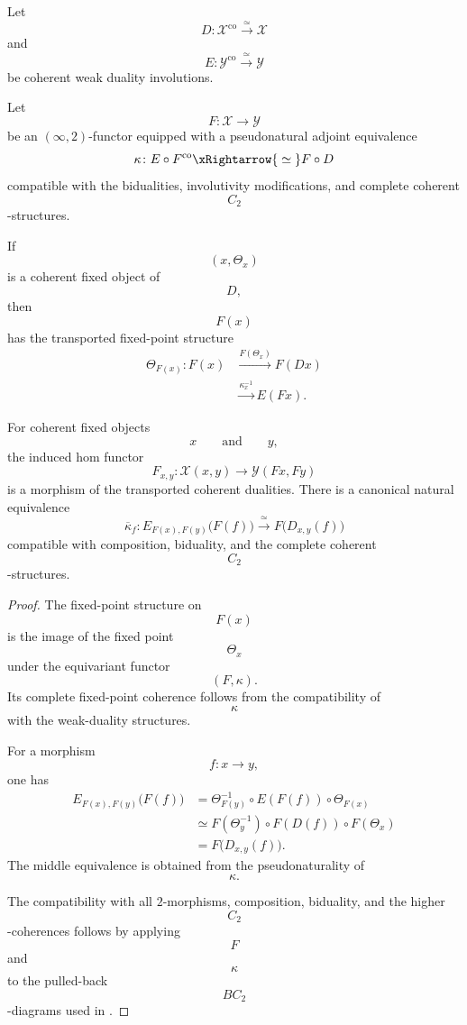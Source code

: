 \begin{proposition}
\label{prop:fixed-endpoint-transport-functoriality}
Let
\[
    D
    \colon
    \mathcal X^{\mathrm{co}}
    \xrightarrow{\;\simeq\;}
    \mathcal X
\]
and
\[
    E
    \colon
    \mathcal Y^{\mathrm{co}}
    \xrightarrow{\;\simeq\;}
    \mathcal Y
\]
be coherent weak duality involutions.

Let
\[
    F
    \colon
    \mathcal X
    \longrightarrow
    \mathcal Y
\]
be an $(\infty,2)$-functor equipped with a pseudonatural adjoint
equivalence
\[
    \kappa
    \colon
    E\circ F^{\mathrm{co}}
    \xRightarrow{\;\simeq\;}
    F\circ D
\]
compatible with the bidualities, involutivity modifications, and complete
coherent
\[
    C_2
\]
-structures.

If
\[
    (x,\Theta_x)
\]
is a coherent fixed object of
\[
    D,
\]
then
\[
    F(x)
\]
has the transported fixed-point structure
\[
\begin{aligned}
    \Theta_{F(x)}
    \colon
    F(x)
    &\xrightarrow{F(\Theta_x)}
    F(Dx)
    \\
    &\xrightarrow{\kappa_x^{-1}}
    E(Fx).
\end{aligned}
\]

For coherent fixed objects
\[
    x
    \qquad\text{and}\qquad
    y,
\]
the induced hom functor
\[
    F_{x,y}
    \colon
    \mathcal X(x,y)
    \longrightarrow
    \mathcal Y(Fx,Fy)
\]
is a morphism of the transported coherent dualities. There is a canonical
natural equivalence
\[
    \overline\kappa_f
    \colon
    E_{F(x),F(y)}
    \bigl(
        F(f)
    \bigr)
    \xrightarrow{\;\simeq\;}
    F
    \bigl(
        D_{x,y}(f)
    \bigr)
\]
compatible with composition, biduality, and the complete coherent
\[
    C_2
\]
-structures.
\end{proposition}

\begin{proof}
The fixed-point structure on
\[
    F(x)
\]
is the image of the fixed point
\[
    \Theta_x
\]
under the equivariant functor
\[
    (F,\kappa).
\]
Its complete fixed-point coherence follows from the compatibility of
\[
    \kappa
\]
with the weak-duality structures.

For a morphism
\[
    f
    \colon
    x
    \longrightarrow
    y,
\]
one has
\[
\begin{aligned}
    E_{F(x),F(y)}
    \bigl(
        F(f)
    \bigr)
    &=
    \Theta_{F(y)}^{-1}
    \circ
    E(F(f))
    \circ
    \Theta_{F(x)}
    \\
    &\simeq
    F(\Theta_y^{-1})
    \circ
    F(D(f))
    \circ
    F(\Theta_x)
    \\
    &=
    F
    \bigl(
        D_{x,y}(f)
    \bigr).
\end{aligned}
\]
The middle equivalence is obtained from the pseudonaturality of
\[
    \kappa.
\]

The compatibility with all $2$-morphisms, composition, biduality, and the
higher
\[
    C_2
\]
-coherences follows by applying
\[
    F
\]
and
\[
    \kappa
\]
to the pulled-back
\[
    BC_2
\]
-diagrams used in
.
\end{proof}


